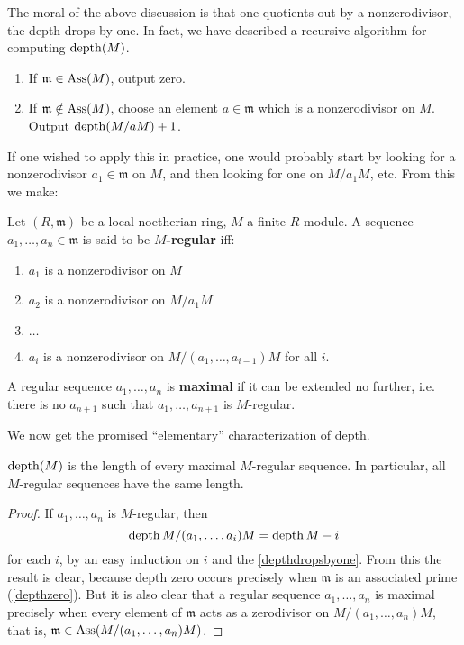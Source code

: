 The moral of the above discussion is that one quotients out by a nonzerodivisor, the depth drops by one.
In fact, we have described a recursive algorithm for computing
$\operatorname{depth}(M)$.
\begin{enumerate}
\item If $\mathfrak{m}  \in \operatorname{Ass}(M)$, output zero.
\item If $\mathfrak{m} \notin \operatorname{Ass}(M)$, choose an element $a
\in\mathfrak{m}$
which is a nonzerodivisor on $M$. Output $\operatorname{depth}(M/aM) +1$.
\end{enumerate}


If one wished to apply this in practice, one would probably start by
looking for a
nonzerodivisor $a_1 \in \mathfrak{m}$ on $M$, and then looking for
one on $M/a_1
M$, etc.
From this we make:

\begin{definition}
Let $(R, \mathfrak{m})$ be a local noetherian ring, $M$ a finite
$R$-module. A
sequence $a_1, \dots, a_n \in \mathfrak{m}$ is said to be
\textbf{$M$-regular} iff:
\begin{enumerate}
\item $a_1$ is a nonzerodivisor on $M$
\item $a_2$ is a nonzerodivisor on $M/a_1 M$
\item  $\dots$
\item $a_i$ is a nonzerodivisor on $M/(a_1, \dots, a_{i-1})M$
for all $i$.
\end{enumerate}
A regular sequence $a_1, \dots, a_n$ is \textbf{maximal } if it
can be extended
no further, i.e. there is no $a_{n+1}$ such that $a_1, \dots,
a_{n+1}$ is
$M$-regular.
\end{definition}

We now get the promised ``elementary'' characterization of depth. 
\begin{corollary} \label{depthregular}
$\operatorname{depth}(M)$ is the length of every maximal $M$-regular
sequence. In particular,
all $M$-regular sequences have the same length.
\end{corollary}

\begin{proof}
If $a_1, \dots, a_n$ is $M$-regular, then
\[ \operatorname{depth} M/(a_1, \dots, a_i)M = \operatorname{depth} M -i  \]
for each $i$, by an easy induction on $i$ and the \cref{depthdropsbyone}.
From this the result is clear, because depth zero occurs precisely when
$\mathfrak{m}$ is an associated prime (\cref{depthzero}). But it is also clear 
that a regular sequence $a_1, \dots, a_n$ is maximal precisely when every
element of $\mathfrak{m}$ acts as a zerodivisor on $M/(a_1, \dots, a_n) M$,
that is, $\mathfrak{m} \in \operatorname{Ass}(M/(a_1, \dots, a_n)M)$.
\end{proof}

